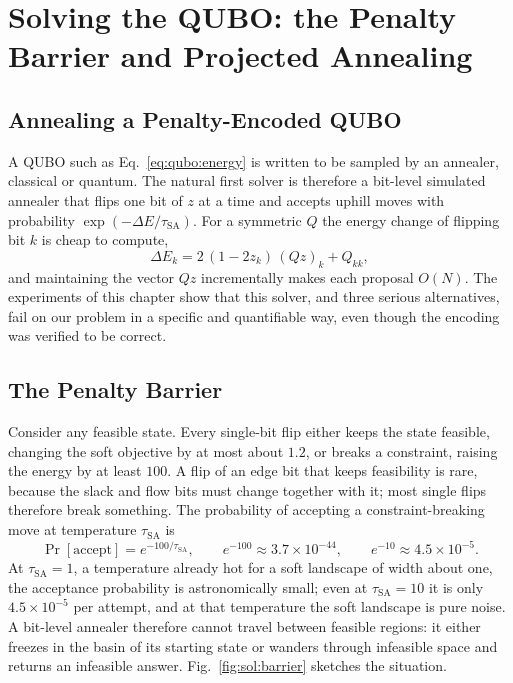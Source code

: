 \chapter{Solving the QUBO: the Penalty Barrier and Projected Annealing}
\label{ch:solvers}

\section{Annealing a Penalty-Encoded QUBO}

A QUBO such as Eq.~\eqref{eq:qubo:energy} is written to be sampled by an
annealer, classical or quantum. The natural first solver is therefore a
bit-level simulated annealer that flips one bit of $z$ at a time and accepts
uphill moves with probability $\exp(-\Delta E/\tau_{\mathrm{SA}})$. For a
symmetric $Q$ the energy change of flipping bit $k$ is cheap to compute,
\begin{equation}
\Delta E_k=2\,(1-2z_k)\,(Qz)_k+Q_{kk},
\label{eq:sol:delta}
\end{equation}
and maintaining the vector $Qz$ incrementally makes each proposal $O(N)$.
The experiments of this chapter show that this solver, and three serious
alternatives, fail on our problem in a specific and quantifiable way, even
though the encoding was verified to be correct.

\section{The Penalty Barrier}

Consider any feasible state. Every single-bit flip either keeps the state
feasible, changing the soft objective by at most about $1.2$, or breaks a
constraint, raising the energy by at least $100$. A flip of an edge bit that
keeps feasibility is rare, because the slack and flow bits must change
together with it; most single flips therefore break something. The
probability of accepting a constraint-breaking move at temperature
$\tau_{\mathrm{SA}}$ is
\[
\Pr[\text{accept}]=e^{-100/\tau_{\mathrm{SA}}},\qquad
e^{-100}\approx3.7\times10^{-44},\qquad e^{-10}\approx4.5\times10^{-5}.
\]
At $\tau_{\mathrm{SA}}=1$, a temperature already hot for a soft landscape of
width about one, the acceptance probability is astronomically small; even at
$\tau_{\mathrm{SA}}=10$ it is only $4.5\times10^{-5}$ per attempt, and at that
temperature the soft landscape is pure noise. A bit-level annealer therefore
cannot travel between feasible regions: it either freezes in the basin of
its starting state or wanders through infeasible space and returns an
infeasible answer. Fig.~\ref{fig:sol:barrier} sketches the situation.


